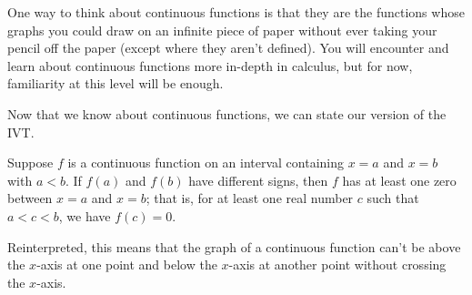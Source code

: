 \documentclass[noauthor, nooutcomes]{ximera}
\begin{document}
One way to think about continuous functions is that they are the functions whose graphs you could draw on an infinite piece of paper without ever taking your pencil off the paper (except where they aren't defined). You will encounter and learn about continuous functions more in-depth in calculus, but for now, familiarity at this level will be enough.

Now that we know about continuous functions, we can state our version of the IVT. 

\begin{theorem}
Suppose $f$ is a continuous function on an interval containing $x = a$ and $x = b$ with $a < b$. If $f(a)$ and $f(b)$ have different signs, then $f$ has at least one zero between $x = a$ and $x = b$; that is, for at least one real number $c$ such that $a < c < b$, we have $f(c) = 0$.
\end{theorem}

Reinterpreted, this means that the graph of a continuous function can't be above the $x$-axis at one point and below the $x$-axis at another point without crossing the $x$-axis. 

%		                	
\end{document}

